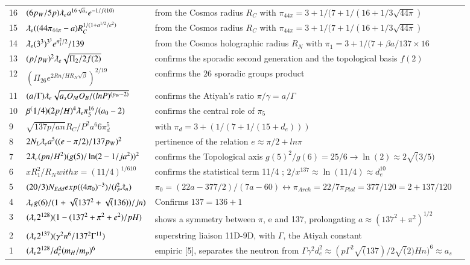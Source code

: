 \documentclass[a4paper,9pt]{article}
\begin{document}
\begin{appendix}
\begin{table}
\begin{tabular}{llll}
   16 & $(6p_W/5p)\lambdabar_{e} a^{16 \sqrt a_s} e^{-1/f(10)}$ & from the Cosmos radius $R_C$ with $\pi_{44\pi} = 3+1/(7 + 1/(16 + 1/3\sqrt{44\pi})$  \\
  
   15 & $\lambdabar_{e} ((44\pi_{44\pi} -a) R_C^{1/(1+ a^{1/2} /e^2)}$ & from the Cosmos radius $R_C$ with $\pi_{44\pi} = 3+1/(7 + 1/(16 + 1/3\sqrt{44\pi})$  \\ 
        
     14 & $ \lambdabar_{e} (3^3)^{3^3} e^{\pi_1^2/2}/139  $ & from the Cosmos holographic radius $R_N$ with $\pi_1 = 3+1/(7 + \beta a/137\times 16$  \\
     13 & $ (p/p_W)^2 \lambdabar_{e} \sqrt{\Pi_2/2f(2)}  $ & confirms the sporadic second generation and the topological basis $f(2)$ \\
     12 & $  (   \Pi_{26}e^   {2Rn/HR_N\sqrt{\beta}   }     )^{2/19}  $ & confirms the $26$ sporadic groups product  \\       
     11 & $ (a/\Gamma) \lambdabar_{e} \sqrt{a_s O_M O_B/(lnP)^{(p_W-2)}}  $ & confirms the Atiyah's ratio $\pi/\gamma = a/\Gamma$  \\    
     10 & $ \beta ^(1/4) (2p/H)^4 \lambdabar_{e} \pi_5^{16}/(a_0 - 2) $   & confirms the central role of $\pi_5$ \\
    
      9 & $ \sqrt{137p/an} R_C/P^2 a^6 6\pi_d^5 $   & with $\pi_d = 3 + (1/(7+1/(15 + d_e)))$  \\           
      8 & $2 N_L\lambdabar_{e} a^5((e-\pi/2)/137p_W)^2$   & pertinence of the relation $e \approx \pi/2 + ln\pi$  \\       
      7 & $2\lambdabar_{e} (pn/H^{2})(g(5)/\ln(2-1/ja^2))^2$   & confirms the Topological axis $g(5)^2/g(6) = 25/6 \rightarrow \ln(2) \approx 2\sqrt(3/5)$  \\    
      6 & $xR_1^2/R_N with x = (11/4)^{1/610}$ &  confirms the statistical term 11/4 ; $2/x^{137} \approx \ln(11/4) \approx d_e^{10}$ \\    
      5 & $(20/3)N_{Edd} exp((4 \pi_0)^{-3})/(l_P^2\lambdabar_n)$ & $\pi_0 =  (22a - 377/2)/(7a - 60) \leftrightarrow \pi_{Arch} = 22/7  \pi_{Ptol} = 377/120 = 2 + 137/120$  \\    
      4 & $\lambdabar_{e} g(6)/(1+\sqrt(137^2+\sqrt(136))/jn)$  & Confirms $137=136+1$ \\
      3 & $(\lambdabar_{e} 2^{128})(1-(137^2+\pi^2+e^2)/pH)$ & shows a symmetry between $\pi$, e and 137, prolongating $ a \approx (137^2 + \pi^2)^{1/2}$ \\
      2 & $(\lambdabar_{e} 2^{137})(\gamma^2 n^6 / 137^2 \Gamma^{11})$ & superstring liaison 11D-9D, with $\Gamma$, the Atiyah constant \\
      1 & $(\lambdabar_{e} 2^{128}/d_e^2(m_H/m_p)^6$  & empiric [5], separates the neutron from $\Gamma \gamma^2 d_e^2 \approx (p\Gamma^2 \sqrt(137)/2 \sqrt(2) Hn)^6 \approx a_s$ \\
    

\end{tabular}
\end{table}
\end{appendix}
\end{document}
